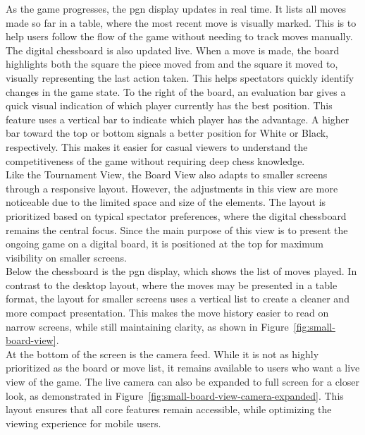 As the game progresses, the \gls{pgn} display updates in real time. It lists all moves made so far in a table, where the most recent move is visually marked. This is to help users follow the flow of the game without needing to track moves manually. The digital chessboard is also updated live. When a move is made, the board highlights both the square the piece moved from and the square it moved to, visually representing the last action taken. This helps spectators quickly identify changes in the game state. To the right of the board, an evaluation bar gives a quick visual indication of which player currently has the best position. This feature uses a vertical bar to indicate which player has the advantage. A higher bar toward the top or bottom signals a better position for White or Black, respectively. This makes it easier for casual viewers to understand the competitiveness of the game without requiring deep chess knowledge. \\

Like the Tournament View, the Board View also adapts to smaller screens through a responsive layout. However, the adjustments in this view are more noticeable due to the limited space and size of the elements. The layout is prioritized based on typical spectator preferences, where the digital chessboard remains the central focus. Since the main purpose of this view is to present the ongoing game on a digital board, it is positioned at the top for maximum visibility on smaller screens. \\

Below the chessboard is the \gls{pgn} display, which shows the list of moves played. In contrast to the desktop layout, where the moves may be presented in a table format, the layout for smaller screens uses a vertical list to create a cleaner and more compact presentation. This makes the move history easier to read on narrow screens, while still maintaining clarity, as shown in Figure~\ref{fig:small-board-view}. \\

At the bottom of the screen is the camera feed. While it is not as highly prioritized as the board or move list, it remains available to users who want a live view of the game. The live camera can also be expanded to full screen for a closer look, as demonstrated in Figure~\ref{fig:small-board-view-camera-expanded}. This layout ensures that all core features remain accessible, while optimizing the viewing experience for mobile users. \\

